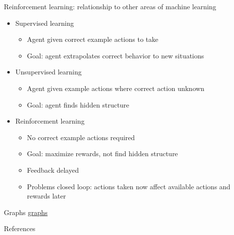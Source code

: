 \documentclass{beamer}
\begin{document}
\begin{frame}[c]{Reinforcement learning: relationship to other areas of machine learning}
\begin{itemize}%
  \item Supervised learning
  \begin{itemize}
    \item Agent given correct example actions to take
    \item Goal: agent extrapolates correct behavior to new situations
  \end{itemize}
  \item Unsupervised learning
  \begin{itemize}
    \item Agent given example actions where correct action unknown
    \item Goal: agent finds hidden structure
  \end{itemize}
  \item Reinforcement learning
\begin{itemize}
  \item No correct example actions required
  \item Goal: maximize rewards, not find hidden structure
  \item Feedback delayed
  \item Problems closed loop: actions taken now affect available actions and rewards later
\end{itemize}
\end{itemize}
\end{frame}

\begin{frame}[c]{Graphs}
  \href{https://www.desmos.com/calculator/bhofs34c6k}{graphs}
\end{frame}


\begin{frame}[allowframebreaks]{References}

\printbibliography[heading=none]

\end{frame}
\end{document}
